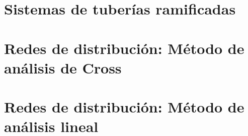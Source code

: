 \documentclass[10pt, oneside]{article}
\begin{document}
\section{Sistemas de tuber\'ias ramificadas} 

\section{Redes de distribuci\'on: M\'etodo de an\'alisis de Cross}

\section{Redes de distribuci\'on: M\'etodo de an\'alisis lineal}




\end{document}
